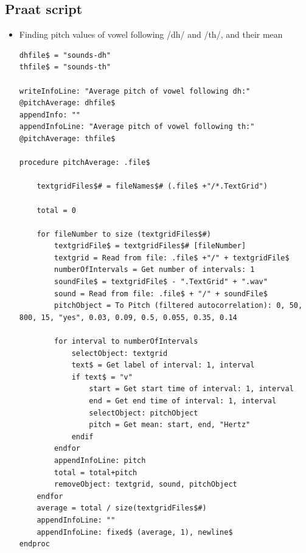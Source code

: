 \documentclass[12pt, english]{article}
\begin{document}
\subsection{Praat script}
\begin{itemize}
    \item Finding pitch values of vowel following /dh/ and /th/, and their mean
    \begin{lstlisting}[xleftmargin=0pt]
dhfile$ = "sounds-dh"
thfile$ = "sounds-th"

writeInfoLine: "Average pitch of vowel following dh:"
@pitchAverage: dhfile$
appendInfo: ""
appendInfoLine: "Average pitch of vowel following th:"
@pitchAverage: thfile$

procedure pitchAverage: .file$

	textgridFiles$# = fileNames$# (.file$ +"/*.TextGrid")

	total = 0

	for fileNumber to size (textgridFiles$#)
		textgridFile$ = textgridFiles$# [fileNumber]
		textgrid = Read from file: .file$ +"/" + textgridFile$
		numberOfIntervals = Get number of intervals: 1
		soundFile$ = textgridFile$ - ".TextGrid" + ".wav"
		sound = Read from file: .file$ + "/" + soundFile$
		pitchObject = To Pitch (filtered autocorrelation): 0, 50, 800, 15, "yes", 0.03, 0.09, 0.5, 0.055, 0.35, 0.14
	
		for interval to numberOfIntervals
			selectObject: textgrid
			text$ = Get label of interval: 1, interval
			if text$ = "v"
				start = Get start time of interval: 1, interval
				end = Get end time of interval: 1, interval
				selectObject: pitchObject
				pitch = Get mean: start, end, "Hertz"
			endif
		endfor
		appendInfoLine: pitch
		total = total+pitch
		removeObject: textgrid, sound, pitchObject
	endfor
	average = total / size(textgridFiles$#)
	appendInfoLine: ""
	appendInfoLine: fixed$ (average, 1), newline$
endproc
    \end{lstlisting}
\end{itemize}
\end{document}
